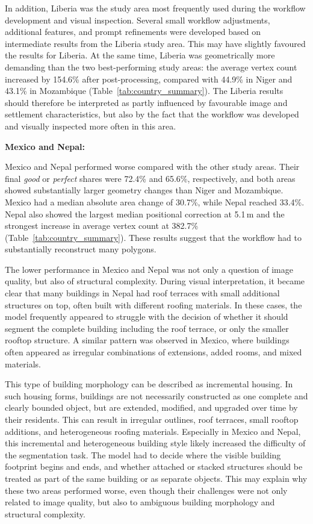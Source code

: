 In addition, Liberia was the study area most frequently used during the workflow development and visual inspection. Several small workflow adjustments, additional features, and prompt refinements were developed based on intermediate results from the Liberia study area. This may have slightly favoured the results for Liberia. At the same time, Liberia was geometrically more demanding than the two best-performing study areas: the average vertex count increased by 154.6\% after post-processing, compared with 44.9\% in Niger and 43.1\% in Mozambique (Table~\ref{tab:country_summary}). The Liberia results should therefore be interpreted as partly influenced by favourable image and settlement characteristics, but also by the fact that the workflow was developed and visually inspected more often in this area.

\textbf{Mexico and Nepal:}

Mexico and Nepal performed worse compared with the other study areas. Their final \textit{good} or \textit{perfect} shares were 72.4\% and 65.6\%, respectively, and both areas showed substantially larger geometry changes than Niger and Mozambique. Mexico had a median absolute area change of 30.7\%, while Nepal reached 33.4\%. Nepal also showed the largest median positional correction at 5.1\,m and the strongest increase in average vertex count at 382.7\% (Table~\ref{tab:country_summary}). These results suggest that the workflow had to substantially reconstruct many polygons.

The lower performance in Mexico and Nepal was not only a question of image quality, but also of structural complexity. During visual interpretation, it became clear that many buildings in Nepal had roof terraces with small additional structures on top, often built with different roofing materials. In these cases, the model frequently appeared to struggle with the decision of whether it should segment the complete building including the roof terrace, or only the smaller rooftop structure. A similar pattern was observed in Mexico, where buildings often appeared as irregular combinations of extensions, added rooms, and mixed materials.

This type of building morphology can be described as incremental housing. In such housing forms, buildings are not necessarily constructed as one complete and clearly bounded object, but are extended, modified, and upgraded over time by their residents. This can result in irregular outlines, roof terraces, small rooftop additions, and heterogeneous roofing materials. Especially in Mexico and Nepal, this incremental and heterogeneous building style likely increased the difficulty of the segmentation task. The model had to decide where the visible building footprint begins and ends, and whether attached or stacked structures should be treated as part of the same building or as separate objects. This may explain why these two areas performed worse, even though their challenges were not only related to image quality, but also to ambiguous building morphology and structural complexity.

